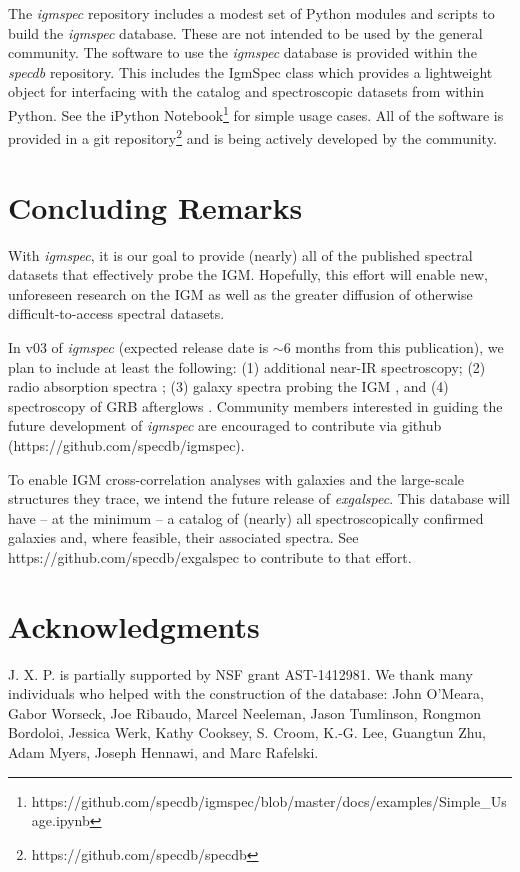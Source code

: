 \documentclass[12pt]{elsarticle}
\begin{document}
The {\it igmspec} repository includes 
a modest set of Python modules and scripts to build the
{\it igmspec} database.  
These are not intended to be used by the general community.
The software to use the {\it igmspec}
database is provided within the {\it specdb} repository.
This includes the
IgmSpec class which provides a lightweight object for
interfacing with the catalog and spectroscopic datasets
from within Python.  See the iPython Notebook\footnote{
https://github.com/specdb/igmspec/blob/master/docs/examples/Simple\_Usage.ipynb}
for simple usage cases.
All of the software is provided in a git repository\footnote{
https://github.com/specdb/specdb}
and is being actively developed by the community.

\section{Concluding Remarks}
\label{sec:end}

With {\it igmspec}, it is our goal to provide (nearly)
all of the published spectral datasets that effectively
probe the IGM.  Hopefully, this effort will
enable new, unforeseen research on the IGM as well
as the greater diffusion of otherwise difficult-to-access spectral
datasets.  

In v03 of
{\it igmspec} (expected release date is $\sim 6$ months from
this publication), we plan to include at least the following:
(1) additional near-IR spectroscopy;
(2) radio absorption spectra \citep[e.g. 21\,cm;][]{kanekar+14};
(3) galaxy spectra probing the IGM \citep[e.g.][]{rpk+10}, 
and
(4) spectroscopy of GRB afterglows \citep[e.g.][]{fjp+09}.
Community members interested in guiding the future development
of {\it igmspec} are encouraged to contribute via github
(https://github.com/specdb/igmspec).

To enable IGM cross-correlation analyses with galaxies
and the large-scale structures they trace,
we intend the future release of {\it exgalspec}.
This database will have -- at
the minimum -- a catalog of (nearly) all spectroscopically
confirmed galaxies and, where feasible, their associated
spectra.  See https://github.com/specdb/exgalspec
to contribute to that effort.


\section{Acknowledgments}

J. X. P. is partially supported by NSF grant AST-1412981.
We thank many individuals who helped with the construction
of the database:
John O'Meara, Gabor Worseck, Joe Ribaudo, Marcel Neeleman,
Jason Tumlinson, Rongmon Bordoloi, Jessica Werk,
Kathy Cooksey, S. Croom, K.-G. Lee, Guangtun Zhu,
Adam Myers, Joseph Hennawi,  and Marc Rafelski.
\end{document}
